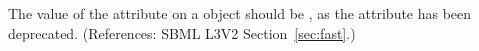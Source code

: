 The value of the attribute  on a \Reaction object should be
, as the attribute has been deprecated.  (References: SBML L3V2
Section~\ref{sec:fast}.)
